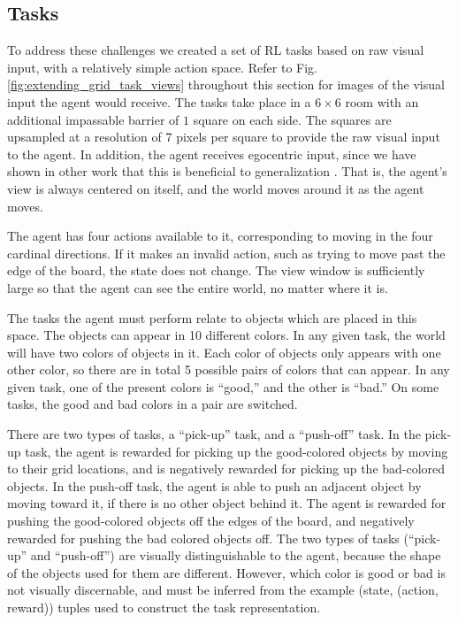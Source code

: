 \subsection{Tasks}
To address these challenges we created a set of RL tasks based on raw visual input, with a relatively simple action space. Refer to Fig. \ref{fig:extending_grid_task_views} throughout this section for images of the visual input the agent would receive. The tasks take place in a \(6 \times 6\) room with an additional impassable barrier of \(1\) square on each side. The squares are upsampled at a resolution of 7 pixels per square to provide the raw visual input to the agent. In addition, the agent receives egocentric input, since we have shown in other work that this is beneficial to generalization \citep{Hill2019a}. That is, the agent's view is always centered on itself, and the world moves around it as the agent moves. \par
The agent has four actions available to it, corresponding to moving in the four cardinal directions. If it makes an invalid action, such as trying to move past the edge of the board, the state does not change. The view window is sufficiently large so that the agent can see the entire world, no matter where it is.\par 
The tasks the agent must perform relate to objects which are placed in this space. The objects can appear in 10 different colors. In any given task, the world will have two colors of objects in it. Each color of objects only appears with one other color, so there are in total 5 possible pairs of colors that can appear. In any given task, one of the present colors is ``good,'' and the other is ``bad.'' On some tasks, the good and bad colors in a pair are switched.\par
There are two types of tasks, a ``pick-up'' task, and a ``push-off'' task. In the pick-up task, the agent is rewarded for picking up the good-colored objects by moving to their grid locations, and is negatively rewarded for picking up the bad-colored objects. In the push-off task, the agent is able to push an adjacent object by moving toward it, if there is no other object behind it. The agent is rewarded for pushing the good-colored objects off the edges of the board, and negatively rewarded for pushing the bad colored objects off. The two types of tasks (``pick-up'' and ``push-off'') are visually distinguishable to the agent, because the shape of the objects used for them are different. However, which color is good or bad is not visually discernable, and must be inferred from the example (state, (action, reward)) tuples used to construct the task representation.\par 
